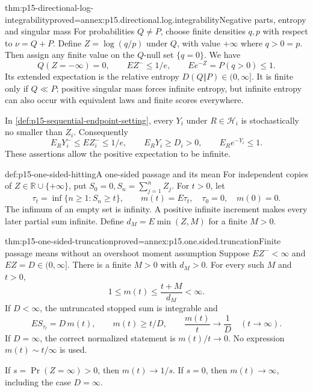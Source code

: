 \begin{hblemma}{thm:p15-directional-log-integrability}{proved=annex:p15.directional.log.integrability}{Negative parts, entropy and singular mass}
For probabilities \(Q\ne P\), choose finite densities \(q,p\) with
respect to \(\nu=Q+P\). Define \(Z=\log(q/p)\) under \(Q\),
with value \(+\infty\) where \(q>0=p\). Then
assign any finite value on the \(Q\)-null set \(\{q=0\}\). We have
\[
 Q(Z=-\infty)=0,\qquad EZ^-\leq 1/e,\qquad
 E e^{-Z}=P(q>0)\leq1.
\]
Its extended expectation is the relative entropy
\(D(Q\Vert P)\in(0,\infty]\).
It is finite only if \(Q\ll P\); positive singular mass forces
infinite entropy, but infinite entropy can also occur with equivalent
laws and finite scores everywhere.

In \cref{def:p15-sequential-endpoint-setting}, every \(Y_i\) under
\(R\in\mathcal H_i\) is stochastically no smaller than \(Z_i\).
Consequently
\[
 E_RY_i^-\leq EZ_i^-\leq1/e,\qquad
 E_RY_i\geq D_i>0,\qquad E_Re^{-Y_i}\leq1.
\]
These assertions allow the positive expectation to be infinite.
\end{hblemma}

\begin{hbdefinition}{def:p15-one-sided-hitting}{A one-sided passage and its mean}
For independent copies of \(Z\in\mathbb R\cup\{+\infty\}\), put
\(S_0=0,S_n=\sum_{j=1}^nZ_j\). For \(t>0\), let
\[
 \tau_t=\inf\{n\geq1:S_n\geq t\},\qquad m(t)=E\tau_t,
 \quad \tau_0=0,\quad m(0)=0.
\]
The infimum of an empty set is infinity. A positive infinite increment
makes every later partial sum infinite. Define
\(d_M=E\min(Z,M)\) for a finite \(M>0\).
\end{hbdefinition}

\begin{hbtheorem}{thm:p15-one-sided-truncation}{proved=annex:p15.one.sided.truncation}{Finite passage means without an overshoot moment assumption}
Suppose \(EZ^-<\infty\) and \(EZ=D\in(0,\infty]\).
There is a finite \(M>0\) with \(d_M>0\). For every such \(M\)
and \(t>0\),
\[
 1\leq m(t)\leq\frac{t+M}{d_M}<\infty.
\]
If \(D<\infty\), the untruncated stopped sum is integrable and
\[
 ES_{\tau_t}=D\,m(t),\qquad m(t)\geq t/D,\qquad
 \frac{m(t)}t\longrightarrow\frac1D\quad(t\to\infty).
\]
If \(D=\infty\), the correct normalized statement is
\(m(t)/t\to0\). No expression \(m(t)\sim t/\infty\) is used.

If \(s=\Pr(Z=\infty)>0\), then \(m(t)\to1/s\).
If \(s=0\), then \(m(t)\to\infty\), including the case \(D=\infty\).
\end{hbtheorem}

